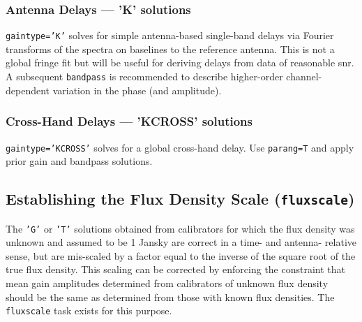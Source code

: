 \subsubsection{Antenna Delays --- 'K' solutions}
\label{section:cal.solve.gain.k}
{\tt gaintype='K'} solves for simple antenna-based single-band delays
                   via Fourier transforms of the spectra on baselines to the
                   reference antenna. This is not a global fringe fit
                   but will be useful for deriving delays from data of
                   reasonable snr. A subsequent {\tt bandpass} is 
                   recommended to describe higher-order channel-dependent
		   variation in the phase (and amplitude).
\subsubsection{Cross-Hand  Delays --- 'KCROSS' solutions}
\label{section:cal.solve.gain.kcross}
{\tt gaintype='KCROSS'} solves for a global cross-hand
                   delay.  Use {\tt parang=T} and apply prior gain and
                   bandpass solutions. 



\subsection{Establishing the Flux Density Scale ({\tt fluxscale}) }
\label{section:cal.solve.fluxscale}

The {\tt 'G'} or {\tt 'T'} solutions obtained from calibrators for
which the flux 
density was unknown and assumed to be 1 Jansky are correct in a time- and
antenna- relative sense, but are mis-scaled by a factor equal to the
inverse of the square root of the true flux density.  This scaling can
be corrected by enforcing the constraint that mean gain amplitudes
determined from calibrators of unknown flux density should be the same
as determined from those with known flux densities.  The {\tt
fluxscale} task exists for this purpose.  

